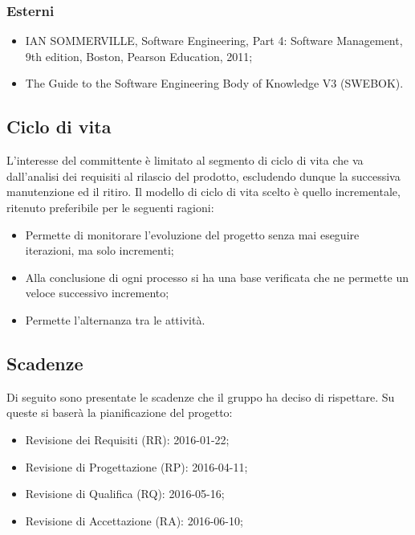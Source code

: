 \subsubsection{Esterni}
\begin{itemize}
\item IAN SOMMERVILLE, Software Engineering, Part 4: Software Management, 9th edition, Boston, Pearson Education, 2011;
\item The Guide to the Software Engineering Body of Knowledge V3 (SWEBOK).
\end{itemize}

\subsection{Ciclo di vita}
L’interesse del committente è limitato al segmento di ciclo di vita che va dall’analisi dei requisiti al
rilascio del prodotto, escludendo dunque la successiva manutenzione ed il ritiro. Il modello di ciclo di
vita scelto \`e quello incrementale, ritenuto preferibile per le seguenti ragioni:
\begin{itemize}
\item Permette di monitorare l'evoluzione del progetto senza mai eseguire iterazioni, ma solo incrementi;
\item Alla conclusione di ogni processo si ha una base verificata che ne permette un veloce successivo incremento;
\item Permette l'alternanza tra le attivit\`a.
\end{itemize}

\subsection{Scadenze}
Di seguito sono presentate le scadenze che il gruppo ha deciso di rispettare. Su queste si baserà la pianificazione del progetto:
\begin{itemize}
\item Revisione dei Requisiti (RR): 2016-01-22;
\item Revisione di Progettazione (RP): 2016-04-11;
\item Revisione di Qualifica (RQ): 2016-05-16;
\item Revisione di Accettazione (RA): 2016-06-10;
\end{itemize}

